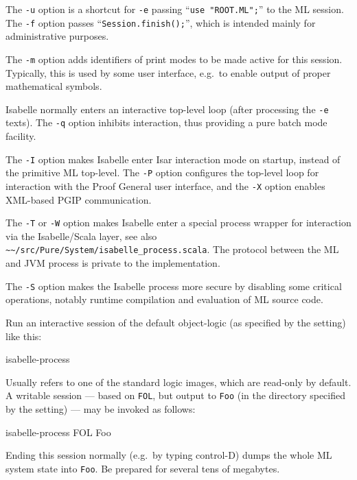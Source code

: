 \begin{isabellebody}
\begin{isamarkuptext}
  \medskip The \verb|-u| option is a shortcut for \verb|-e| passing ``\verb|use "ROOT.ML";|'' to the ML session.
  The \verb|-f| option passes ``\verb|Session.finish();|'', which is intended mainly for administrative
  purposes.

  \medskip The \verb|-m| option adds identifiers of print modes
  to be made active for this session. Typically, this is used by some
  user interface, e.g.\ to enable output of proper mathematical
  symbols.

  \medskip Isabelle normally enters an interactive top-level loop
  (after processing the \verb|-e| texts). The \verb|-q|
  option inhibits interaction, thus providing a pure batch mode
  facility.

  \medskip The \verb|-I| option makes Isabelle enter Isar
  interaction mode on startup, instead of the primitive ML top-level.
  The \verb|-P| option configures the top-level loop for
  interaction with the Proof General user interface, and the
  \verb|-X| option enables XML-based PGIP communication.

  \medskip The \verb|-T| or \verb|-W| option makes
  Isabelle enter a special process wrapper for interaction via the
  Isabelle/Scala layer, see also \verb|~~/src/Pure/System/isabelle_process.scala|.  The protocol between
  the ML and JVM process is private to the implementation.

  \medskip The \verb|-S| option makes the Isabelle process more
  secure by disabling some critical operations, notably runtime
  compilation and evaluation of ML source code.%
\end{isamarkuptext}%
\isamarkuptrue%
%
\isamarkuptrue%
%
\begin{isamarkuptext}%
Run an interactive session of the default object-logic (as specified
  by the \hyperlink{setting.ISABELLE-LOGIC}{\mbox{}} setting) like this:
\begin{ttbox}
isabelle-process
\end{ttbox}

  Usually \hyperlink{setting.ISABELLE-LOGIC}{\mbox{}} refers to one of the standard
  logic images, which are read-only by default.  A writable session
  --- based on \verb|FOL|, but output to \verb|Foo| (in the
  directory specified by the \hyperlink{setting.ISABELLE-OUTPUT}{\mbox{}} setting) ---
  may be invoked as follows:
\begin{ttbox}
isabelle-process FOL Foo
\end{ttbox}
  Ending this session normally (e.g.\ by typing control-D) dumps the
  whole ML system state into \verb|Foo|. Be prepared for several
  tens of megabytes.


\end{isamarkuptext}
\end{isabellebody}
